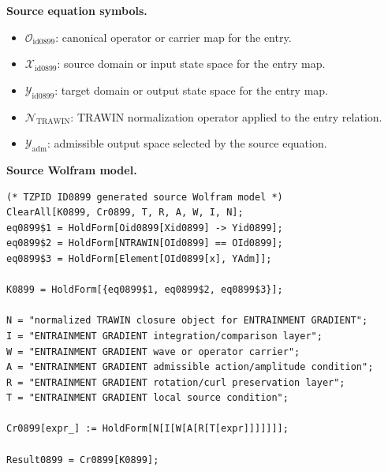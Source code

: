 \begin{minipage}[t]{0.49\linewidth}
\begingroup
\small
\raggedright
\textbf{Source equation symbols.}\par
\begin{itemize}[leftmargin=1.35em,itemsep=1pt,topsep=1pt,parsep=0pt]
    \item $\mathcal{O}_{\mathrm{id0899}}$: canonical operator or carrier map for the entry.
    \item $\mathcal{X}_{\mathrm{id0899}}$: source domain or input state space for the entry map.
    \item $\mathcal{Y}_{\mathrm{id0899}}$: target domain or output state space for the entry map.
    \item $\mathcal{N}_{\mathrm{TRAWIN}}$: TRAWIN normalization operator applied to the entry relation.
    \item $\mathcal{Y}_{\mathrm{adm}}$: admissible output space selected by the source equation.
\end{itemize}
\endgroup
\end{minipage}\hfill
\begin{minipage}[t]{0.47\linewidth}
\begingroup
\scriptsize
\raggedright
\textbf{Source Wolfram model.}\par
\begin{Verbatim}[fontsize=\tiny,breaklines=true,breakanywhere=true]
(* TZPID ID0899 generated source Wolfram model *)
ClearAll[K0899, Cr0899, T, R, A, W, I, N];
eq0899$1 = HoldForm[Oid0899[Xid0899] -> Yid0899];
eq0899$2 = HoldForm[NTRAWIN[OId0899] == OId0899];
eq0899$3 = HoldForm[Element[OId0899[x], YAdm]];

K0899 = HoldForm[{eq0899$1, eq0899$2, eq0899$3}];

N = "normalized TRAWIN closure object for ENTRAINMENT GRADIENT";
I = "ENTRAINMENT GRADIENT integration/comparison layer";
W = "ENTRAINMENT GRADIENT wave or operator carrier";
A = "ENTRAINMENT GRADIENT admissible action/amplitude condition";
R = "ENTRAINMENT GRADIENT rotation/curl preservation layer";
T = "ENTRAINMENT GRADIENT local source condition";

Cr0899[expr_] := HoldForm[N[I[W[A[R[T[expr]]]]]]];

Result0899 = Cr0899[K0899];
\end{Verbatim}
\endgroup
\end{minipage}

